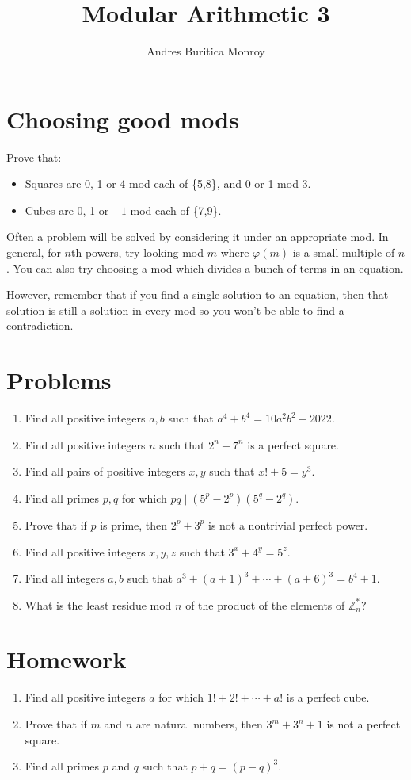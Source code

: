 \documentclass{article}
\title{Modular Arithmetic 3}
\author{Andres Buritica Monroy}
\date{}
\begin{document}
\maketitle
\section{Choosing good mods}
Prove that:
\begin{itemize}
	\item Squares are 0, 1 or 4 mod each of \{5,8\}, and 0 or 1 mod 3.
	\item Cubes are 0, 1 or $-1$ mod each of \{7,9\}.
\end{itemize}
Often a problem will be solved by considering it under an appropriate mod.
In general, for $n$th powers, try looking mod $m$ where $\varphi(m)$ is a
small multiple of $n$.
You can also try choosing a mod which divides a bunch of terms in an
equation.

However, remember that if you find a single solution to an equation, then that
solution is still a solution in every mod so you won't be able to find a
contradiction.
\section{Problems}
\begin{enumerate}
	\item Find all positive integers $a,b$ such that $a^4+b^4=10a^2b^2-2022$.
	\item Find all positive integers $n$ such that $2^n+7^n$ is a perfect square.
	\item Find all pairs of positive integers $x,y$ such that $x!+5=y^3$.
	\item Find all primes $p,q$ for which $pq\mid (5^p-2^p)(5^q-2^q)$.
	\item Prove that if $p$ is prime, then $2^p+3^p$ is not a nontrivial perfect
	      power.
	\item Find all positive integers $x,y,z$ such that $3^x+4^y=5^z$.
	\item Find all integers $a,b$ such that $a^3+(a+1)^3+\cdots+(a+6)^3=b^4+1$.
	\item What is the least residue mod $n$ of the product of the elements of
	      $\mathbb Z_n^*$?
\end{enumerate}
\newpage
\section{Homework}
\begin{enumerate}
	\item Find all positive integers $a$ for which $1!+2!+\cdots+a!$ is a perfect
	      cube.
	\item Prove that if $m$ and $n$ are natural numbers, then $3^m+3^n+1$ is not a
	      perfect square.
	\item Find all primes $p$ and $q$ such that $p+q=(p-q)^3$.
\end{enumerate}
\end{document}
